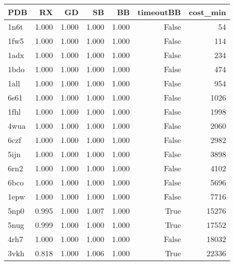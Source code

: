 \begin{tabular}{lrrrrrr}
\toprule
PDB & RX & GD & SB & BB & timeoutBB & cost_min \\
\midrule
1n6t & 1.000 & 1.000 & 1.000 & 1.000 & False & 54 \\
1fw5 & 1.000 & 1.000 & 1.000 & 1.000 & False & 114 \\
1adx & 1.000 & 1.000 & 1.000 & 1.000 & False & 234 \\
1bdo & 1.000 & 1.000 & 1.000 & 1.000 & False & 474 \\
1all & 1.000 & 1.000 & 1.000 & 1.000 & False & 954 \\
6s61 & 1.000 & 1.000 & 1.000 & 1.000 & False & 1026 \\
1fhl & 1.000 & 1.000 & 1.000 & 1.000 & False & 1998 \\
4wua & 1.000 & 1.000 & 1.000 & 1.000 & False & 2060 \\
6czf & 1.000 & 1.000 & 1.000 & 1.000 & False & 2982 \\
5ijn & 1.000 & 1.000 & 1.000 & 1.000 & False & 3898 \\
6rn2 & 1.000 & 1.000 & 1.000 & 1.000 & False & 4102 \\
6bco & 1.000 & 1.000 & 1.000 & 1.000 & False & 5696 \\
1epw & 1.000 & 1.000 & 1.000 & 1.000 & False & 7716 \\
5np0 & 0.995 & 1.000 & 1.007 & 1.000 & True & 15276 \\
5nug & 0.999 & 1.000 & 1.000 & 1.000 & True & 17552 \\
4rh7 & 1.000 & 1.000 & 1.000 & 1.000 & False & 18032 \\
3vkh & 0.818 & 1.000 & 1.006 & 1.000 & True & 22336 \\
\bottomrule
\end{tabular}
